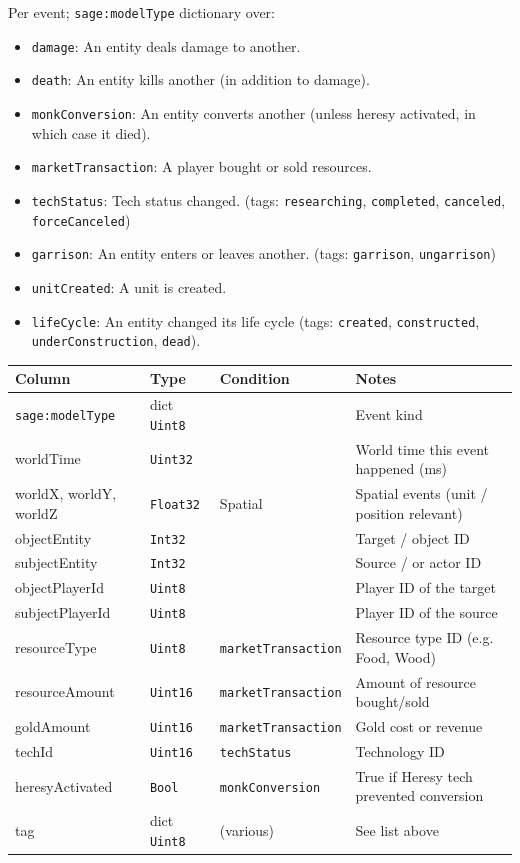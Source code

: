 Per event; \texttt{sage:modelType} dictionary over:
\begin{itemize}
  \item \texttt{damage}: An entity deals damage to another.
  \item \texttt{death}: An entity kills another (in addition to damage).
  \item \texttt{monkConversion}: An entity converts another (unless heresy activated, in which case it died).
  \item \texttt{marketTransaction}: A player bought or sold resources.
  \item \texttt{techStatus}: Tech status changed. (tags: \texttt{researching}, \texttt{completed}, \texttt{canceled}, \texttt{forceCanceled})
  \item \texttt{garrison}: An entity enters or leaves another. (tags: \texttt{garrison}, \texttt{ungarrison})
  \item \texttt{unitCreated}: A unit is created.
  \item \texttt{lifeCycle}: An entity changed its life cycle (tags: \texttt{created}, \texttt{constructed}, \texttt{underConstruction}, \texttt{dead}).
\end{itemize}

\begin{longtable}{@{}p{}p{}p{}p{}@{}}
  \toprule
  Column & Type & Condition & Notes \\
  \midrule
  \endhead
  \texttt{sage:modelType} & dict \texttt{Uint8} & & Event kind \\
  worldTime & \texttt{Uint32} & & World time this event happened (ms) \\
  worldX, worldY, worldZ & \texttt{Float32} & Spatial & Spatial events (unit / position relevant) \\
  objectEntity & \texttt{Int32} & & Target / object ID \\
  subjectEntity & \texttt{Int32} & & Source / or actor ID \\
  objectPlayerId & \texttt{Uint8} & & Player ID of the target \\
  subjectPlayerId & \texttt{Uint8} & & Player ID of the source \\
  resourceType & \texttt{Uint8} & \texttt{marketTransaction} & Resource type ID (e.g. Food, Wood) \\
  resourceAmount & \texttt{Uint16} & \texttt{marketTransaction} & Amount of resource bought/sold \\
  goldAmount & \texttt{Uint16} & \texttt{marketTransaction} & Gold cost or revenue \\
  techId & \texttt{Uint16} & \texttt{techStatus} & Technology ID \\
  heresyActivated & \texttt{Bool} & \texttt{monkConversion} & True if Heresy tech prevented conversion \\
  tag & dict \texttt{Uint8} & (various) & See list above \\
  \bottomrule
\end{longtable}

